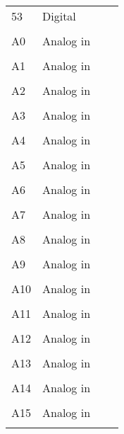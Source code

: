 \documentclass{article}
\begin{document}
\begin{longtable}{|l|l|l|l|}
53&Digital&&\\&&&\\ \hline
A0&Analog in&&\\&&&\\ \hline
A1&Analog in&&\\&&&\\ \hline
A2&Analog in&&\\&&&\\ \hline
A3&Analog in&&\\&&&\\ \hline
A4&Analog in&&\\&&&\\ \hline
A5&Analog in&&\\&&&\\ \hline
A6&Analog in&&\\&&&\\ \hline
A7&Analog in&&\\&&&\\ \hline
A8&Analog in&&\\&&&\\ \hline
A9&Analog in&&\\&&&\\ \hline
A10&Analog in&&\\&&&\\ \hline
A11&Analog in&&\\&&&\\ \hline
A12&Analog in&&\\&&&\\ \hline
A13&Analog in&&\\&&&\\ \hline
A14&Analog in&&\\&&&\\ \hline
A15&Analog in&&\\&&&\\ \hline
 \end{longtable}
\end{document}
